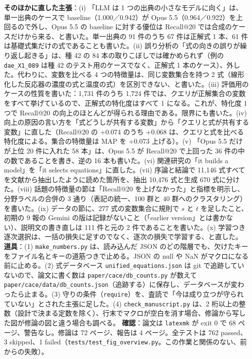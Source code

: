 \documentclass[11pt,a4paper]{jsarticle}
\begin{document}
\begin{itemize}[nosep]
    \textbf{そのほかに直した主張}：(i) 「LLM は 1 つの出典の小さなモデルに向く」は、単一出典のケースで baseline（1.000／0.942）が Opus 5.5（0.964／0.922）を上回るので外し、Opus 5.5 の baseline に対する優位は Recall@20 では合成のケースだけから来る、と書いた。単一出典の 91 件のうち 67 件は正解式 1 本、61 件は基礎式集だけの式であることも書いた。(ii) 誤り分析の「式の向きの誤りが繰り返し起きる」は、種 42 の 84 本の取りこぼしでは確かめられず（例の \texttt{dae\_X1\_089} は種 42 のテスト用のケースでなく、正解式 1 本のケース）、外した。代わりに、変数を比べる 4 つの特徴量は、同じ変数集合を持つ 2 式（線形化した反応器の濃度の式と温度の式）を区別できない、と書いた。(iii) 評価用のケースの性質を書いた：1,731 件のうち 1,724 件では、クエリが正解集合の変数をすべて挙げているので、正解式の特化度はすべて 1 になる。これが、特化度 1 つで Recall@20 の向上のほとんどが得られる理由である。限界にも書いた。(iv) 向上の原因の言い方を「式どうしが共有する変数」から「クエリと式が共有する変数」に直した（Recall@20 の +0.074 のうち +0.068 は、クエリと式を比べる特化度による。集合の特徴量は MAP を +0.073 上げる）。(v) 「Opus 5.5 だけが上位 20 件に入れた 58 本」は、Opus 5.5 が Recall@20 で上回った 36 件の中の数であることを書き、逆の 16 本も書いた。(vi) 関連研究の「it builds a model」を「it selects equations」に直した。(vii) 序論と結論で 11,146 式すべてを文献から抽出したように読めた箇所を、抽出 10,476 式と生成 670 式に分けた。(viii) 話題の特徴量の節は「Recall@20 を上げなかった」と指標を明示し、分野ラベルの合併の 3 通り（表記の統一、100 群と 40 群へのクラスタリング）を書いた。(ix) データの節に、277 式の変数集合に規則で $s$ と $t$ を足したこと、初期の 9 報の Gemini の版は記録がないこと（「earlier version」とは書かない）、説明文の書き直しは 111 件と元の 2 件であることを書いた。(x) 学習つき逐次選択は、一括の損失に足すのでなく、逐次の損失で学習する、と直した。
    \textbf{道具}：(1) \texttt{make\_numbers.py} は、読み込んだ JSON のどの階層でも、欠けたキーをファイル名とキーの道筋つきで止める。JSON の null や NaN がマクロになる前に止める。(2) 式データベース \texttt{unified\_equations.json} は git で追跡していないので、論文に書く数は \texttt{paper/cace/db\_counts.py} が数えて \texttt{paper/cace/data/db\_counts.json}（追跡する）に保存し、データベースが変わったら止まる。(3) 守りの条件（\texttt{require}）を、査読で「今は成り立つが守られていない」とされた主張に足した。(4) \texttt{check\_manuscript.py} は、2 桁以上の整数（設計で決まる定数を除く）、行末でマクロが空白を消す場合、修論から写した図が修論の図と違う場合も調べる。
    \textbf{確認}：論文は \texttt{latexmk} が exit 0 で 68 ページ、警告なし。修論は 72 ページ、報告は 4 ページ。全テストは 762 passed、3 skipped、1 failed（\texttt{tests/test\_fig\_overview.py}。この作業と関係のない、前からの失敗）。

\end{itemize}
\end{document}
